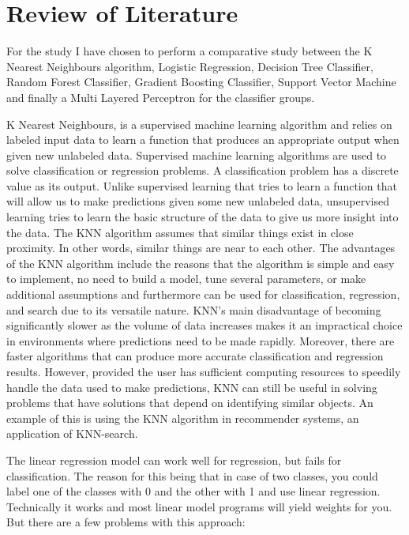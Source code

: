 \documentclass[12pt]{article}
\begin{document}
\newpage
\section{Review of Literature}
For the study I have chosen to perform a comparative study between the K Nearest Neighbours algorithm, Logistic Regression, Decision Tree Classifier, Random Forest Classifier, Gradient Boosting Classifier, Support Vector Machine and finally a Multi Layered Perceptron for the classifier groups. 


K Nearest Neighbours, is a supervised machine learning algorithm and relies on labeled input data to learn a function that produces an appropriate output when given new unlabeled data. Supervised machine learning algorithms are used to solve classification or regression problems. A classification problem has a discrete value as its output. Unlike supervised learning that tries to learn a function that will allow us to make predictions given some new unlabeled data, unsupervised learning tries to learn the basic structure of the data to give us more insight into the data. The KNN algorithm assumes that similar things exist in close proximity. In other words, similar things are near to each other. The advantages of the KNN algorithm include the reasons that the algorithm is simple and easy to implement, no need to build a model, tune several parameters, or make additional assumptions and furthermore can be used for classification, regression, and search due to its versatile nature. KNN’s main disadvantage of becoming significantly slower as the volume of data increases makes it an impractical choice in environments where predictions need to be made rapidly. Moreover, there are faster algorithms that can produce more accurate classification and regression results.
However, provided the user has sufficient computing resources to speedily handle the data used to make predictions, KNN can still be useful in solving problems that have solutions that depend on identifying similar objects. An example of this is using the KNN algorithm in recommender systems, an application of KNN-search.


The linear regression model can work well for regression, but fails for classification. The reason for this being that in case of two classes, you could label one of the classes with 0 and the other with 1 and use linear regression. Technically it works and most linear model programs will yield weights for you. But there are a few problems with this approach:
\end{document}

